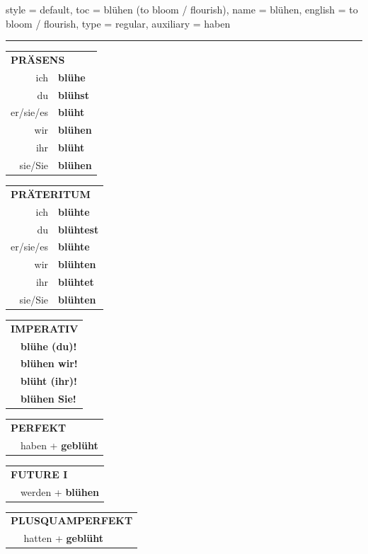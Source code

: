\begin{verbentry}{
  style = {default},
  toc = {blühen (to bloom / flourish)},
  name = {blühen},
  english = {to bloom / flourish},
  type = {regular},
  auxiliary = {haben}
}


\vspace{5pt}
\hrule
\vspace{5pt}

\begin{tabular}{rl}
\multicolumn{2}{l}{\textbf{PRÄSENS}}\\
ich & \textbf{blühe}\\
du & \textbf{blühst}\\
er/sie/es & \textbf{blüht}\\
wir & \textbf{blühen}\\
ihr & \textbf{blüht}\\
sie/Sie & \textbf{blühen}\\
\end{tabular}
\hfill
\begin{tabular}{rl}
\multicolumn{2}{l}{\textbf{PRÄTERITUM}}\\
ich & \textbf{blühte}\\
du & \textbf{blühtest}\\
er/sie/es & \textbf{blühte}\\
wir & \textbf{blühten}\\
ihr & \textbf{blühtet}\\
sie/Sie & \textbf{blühten}\\
\end{tabular}
\hfill
\begin{tabular}{rl}
\multicolumn{2}{l}{\textbf{IMPERATIV}}\\
& \textbf{blühe (du)!}\\
& \textbf{blühen wir!}\\
& \textbf{blüht (ihr)!}\\
& \textbf{blühen Sie!}\\
\end{tabular}

\vspace{10pt}

\begin{tabular}{rl}
\multicolumn{2}{l}{\textbf{PERFEKT}}\\
& haben + \textbf{geblüht}\\
\end{tabular}
\hfill
\begin{tabular}{rl}
\multicolumn{2}{l}{\textbf{FUTURE I}}\\
& werden + \textbf{blühen}\\
\end{tabular}
\hfill
\begin{tabular}{rl}
\multicolumn{2}{l}{\textbf{PLUSQUAMPERFEKT}}\\
& hatten + \textbf{geblüht}\\
\end{tabular}


\end{verbentry}
